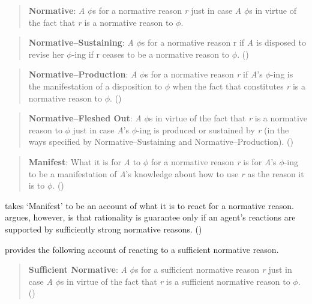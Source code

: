 \documentclass[10pt]{article}
\begin{document}
\begin{quote}
  \textbf{Normative}: \emph{A} \(\phi\)s for a normative reason \emph{r} just in case \emph{A} \(\phi\)s in virtue of the fact that \emph{r} is a normative reason to \(\phi\).
\end{quote}

\begin{quote}
  \textbf{Normative–Sustaining}: \emph{A} \(\phi\)s for a normative reason r if \emph{A} is disposed to revise her \(\phi\)-ing if r ceases to be a normative reason to \(\phi\).\nolinebreak
  \mbox{}\hfill\mbox{(\citeyear[138]{Lord:2018aa})}
\end{quote}

\begin{quote}
  \textbf{Normative–Production}: \emph{A} \(\phi\)s for a normative reason \emph{r} if \emph{A}'s \(\phi\)-ing is the manifestation of a disposition to \(\phi\) when the fact that constitutes \emph{r} is a normative reason to \(\phi\).\nolinebreak
  \mbox{}\hfill\mbox{(\citeyear[139]{Lord:2018aa})}
\end{quote}

\begin{quote}
  \textbf{Normative–Fleshed Out}: \emph{A} \(\phi\)s in virtue of the fact that \emph{r} is a normative reason to \(\phi\) just in case \emph{A}'s \(\phi\)-ing is produced or sustained by \emph{r} (in the ways specified by Normative–Sustaining and Normative–Production).\nolinebreak
  \mbox{}\hfill\mbox{(\citeyear[139]{Lord:2018aa})}
\end{quote}

\begin{quote}
  \textbf{Manifest}: What it is for \emph{A} to \(\phi\) for a normative reason \emph{r} is for \emph{A}'s \(\phi\)-ing to be a manifestation of \emph{A}'s knowledge about how to use \emph{r} as the reason it is to \(\phi\).\nolinebreak
  \mbox{}\hfill\mbox{(\citeyear[139]{Lord:2018aa})}
\end{quote}

\citeauthor{Lord:2018aa} takes `Manifest' to be an account of what it is to react for a normative reason.
\citeauthor{Lord:2018aa} argues, however, is that rationality is guarantee only if an agent's reactions are supported by sufficiently strong normative reasons.
(\citeyear[141]{Lord:2018aa})

\citeauthor{Lord:2018aa} provides the following account of reacting to a sufficient normative reason.

\begin{quote}
  \textbf{Sufficient Normative}: \emph{A} \(\phi\)s for a sufficient normative reason \emph{r} just in case \emph{A} \(\phi\)s in virtue of the fact that \emph{r} is a sufficient normative reason to \(\phi\).\nolinebreak
  \mbox{}\hfill\mbox{(\citeyear[142]{Lord:2018aa})}
\end{quote}
\end{document}
